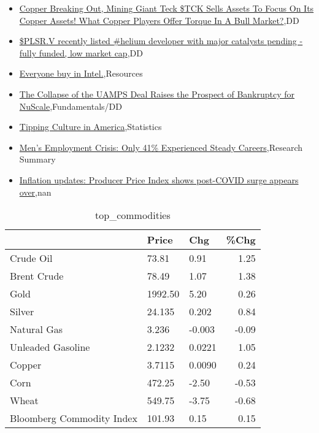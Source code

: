 \documentclass{article}%
\begin{document}
%
\begin{itemize}%
\item%
\href{https://reddit.com/r/Baystreetbets/comments/17wym9i/copper\_breaking\_out\_mining\_giant\_teck\_tck\_sells/}{Copper Breaking Out, Mining Giant Teck \$TCK Sells Assets To Focus On Its Copper Assets! What Copper Players Offer Torque In A Bull Market?},DD%
\item%
\href{https://reddit.com/r/Baystreetbets/comments/17wqvux/plsrv\_recently\_listed\_helium\_developer\_with\_major/}{\$PLSR.V recently listed \#helium developer with major catalysts pending - fully funded, low market cap},DD%
\item%
\href{https://reddit.com/r/StockMarket/comments/17x3aig/everyone\_buy\_in\_intel/}{Everyone buy in Intel.},Resources%
\item%
\href{https://reddit.com/r/StockMarket/comments/17wt2ji/the\_collapse\_of\_the\_uamps\_deal\_raises\_the/}{The Collapse of the UAMPS Deal Raises the Prospect of Bankruptcy for NuScale},Fundamentals/DD%
\item%
\href{https://reddit.com/r/Economics/comments/17wy1kb/tipping\_culture\_in\_america/}{Tipping Culture in America},Statistics%
\item%
\href{https://reddit.com/r/Economics/comments/17wu7po/mens\_employment\_crisis\_only\_41\_experienced\_steady/}{Men's Employment Crisis: Only 41\% Experienced Steady Careers},Research Summary%
\item%
\href{https://reddit.com/r/Economics/comments/17wt49g/inflation\_updates\_producer\_price\_index\_shows/}{Inflation updates: Producer Price Index shows post-COVID surge appears over},nan%
\end{itemize}%


\begin{table}[htbp]%
\caption{top\_commodities}%
\centering%
\begin{adjustbox}{width=1\textwidth}%
\begin{tabular}{lllr}
\toprule
                          &   Price &    Chg &  \%Chg \\
\midrule
               Crude Oil  &   73.81 &   0.91 &  1.25 \\
             Brent Crude  &   78.49 &   1.07 &  1.38 \\
                    Gold  & 1992.50 &   5.20 &  0.26 \\
                  Silver  &  24.135 &  0.202 &  0.84 \\
             Natural Gas  &   3.236 & -0.003 & -0.09 \\
       Unleaded Gasoline  &  2.1232 & 0.0221 &  1.05 \\
                  Copper  &  3.7115 & 0.0090 &  0.24 \\
                    Corn  &  472.25 &  -2.50 & -0.53 \\
                   Wheat  &  549.75 &  -3.75 & -0.68 \\
Bloomberg Commodity Index &  101.93 &   0.15 &  0.15 \\
\bottomrule
\end{tabular}
%
\end{adjustbox}%
\end{table}
\end{document}
